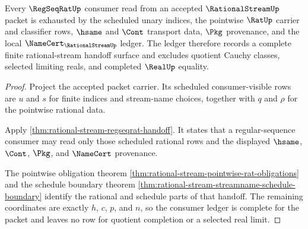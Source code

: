 \begin{theorem}
\label{thm:rational-stream-regseqrat-ledger-completeness}
Every $\RegSeqRatUp$ consumer read from an accepted $\RationalStreamUp$ packet
is exhausted by the scheduled unary indices, the pointwise $\RatUp$ carrier
and classifier rows, $\hsame$ and $\Cont$ transport data, $\Pkg$ provenance,
and the local $\NameCert_{\RationalStreamUp}$ ledger. The ledger therefore
records a complete finite rational-stream handoff surface and excludes
quotient Cauchy classes, selected limiting reals, and completed $\RealUp$
equality.
\end{theorem}
\begin{proof}
Project the accepted packet carrier. Its scheduled consumer-visible rows are
$u$ and $s$ for finite indices and stream-name choices, together with $q$ and
$\rho$ for the pointwise rational data.

Apply \autoref{thm:rational-stream-regseqrat-handoff}. It states that a
regular-sequence consumer may read only those scheduled rational rows and the
displayed $\hsame$, $\Cont$, $\Pkg$, and $\NameCert$ provenance.

The pointwise obligation theorem
\autoref{thm:rational-stream-pointwise-rat-obligations} and the schedule
boundary theorem \autoref{thm:rational-stream-streamname-schedule-boundary}
identify the rational and schedule parts of that handoff. The remaining
coordinates are exactly $h$, $c$, $p$, and $n$, so the consumer ledger is
complete for the packet and leaves no row for quotient completion or a
selected real limit.
\end{proof}

